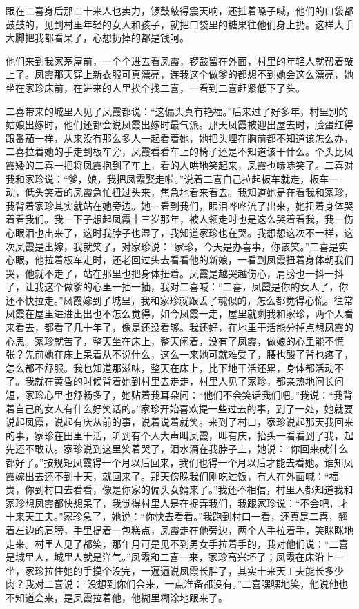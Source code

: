\documentclass[12pt,UTF8]{ctexbook}
\begin{document}
跟在二喜身后那二十来人也卖力，锣鼓敲得震天响，还扯着嗓子喊，他们的口袋都鼓鼓的，见到村里年轻的女人和孩子，就把口袋里的糖果往他们身上扔。这样大手大脚把我都看呆了，心想扔掉的都是钱呵。

他们来到我家茅屋前，一个个进去看凤霞，锣鼓留在外面，村里的年轻人就帮着敲上了。凤霞那天穿上新衣服可真漂亮，连我这个做爹的都想不到她会这么漂亮，她坐在家珍床前，在进来的人里挨个找二喜，一看到二喜赶紧低下了头。

二喜带来的城里人见了凤霞都说：“这偏头真有艳福。”后来过了好多年，村里别的姑娘出嫁时，他们还都会说凤霞出嫁时最气派。那天凤霞被迎出屋去时，脸蛋红得跟番茄一样，从来没有那么多人一起看着她，她把头埋在胸前都不知道该怎么办，二喜拉着她的手走到板车旁，凤霞看看车上的椅子还是不知道该干什么。个头比凤霞矮的二喜一把将凤霞抱到了车上，看的人哄地笑起来，凤霞也哧哧笑了。二喜对我和家珍说：“爹，娘，我把凤霞娶走啦。”说着二喜自己拉起板车就走，板车一动，低头笑着的凤霞急忙扭过头来，焦急地看来看去。我知道她是在看我和家珍，我背着家珍其实就站在她旁边。她一看到我们，眼泪哗哗流了出来，她扭着身体哭着看我们。我一下子想起凤霞十三岁那年，被人领走时也是这么哭着看我，我一伤心眼泪也出来了，这时我脖子也湿了，我知道家珍也在哭。我想想这次不一样，这次凤霞是出嫁，我就笑了，对家珍说：“家珍，今天是办喜事，你该笑。”二喜是实心眼，他拉着板车走时，还老回过头去看看他的新娘，一看到凤霞扭着身体朝我们哭，他就不走了，站在那里也把身体扭着。凤霞是越哭越伤心，肩膀也一抖一抖了，让我这个做爹的心里一抽一抽，我对二喜喊：“二喜，凤霞是你的女人了，你还不快拉走。”凤霞嫁到了城里，我和家珍就跟丢了魂似的，怎么都觉得心慌。往常凤霞在屋里进进出出也不怎么觉得，如今凤霞一走，屋里就剩我和家珍，两个人看来看去，都看了几十年了，像是还没看够。我还好，在地里干活能分掉点想凤霞的心思。家珍就苦了，整天坐在床上，整天闲着，没有了凤霞，做娘的心里能不慌张？先前她在床上呆着从不说什么，这么一来她可就难受了，腰也酸了背也疼了，怎么都不舒服。我也知道那滋味，整天在床上，比下地干活还累，身体都活动不了。我就在黄昏的时候背着她到村里去走走，村里人见了家珍，都亲热地问长问短，家珍心里也舒畅多了，她贴着我耳朵问：“他们不会笑话我们吧。”我说：“我背着自己的女人有什么好笑话的。”家珍开始喜欢提一些过去的事，到了一处，她就要说起凤霞，说起有庆从前的事，说着说着就笑。来到了村口，家珍说起那天我回来的事，家珍在田里干活，听到有个人大声叫凤霞，叫有庆，抬头一看看到了我，起先还不敢认。家珍说到这里笑着哭了，泪水滴在我脖子上，她说：“你回来就什么都好了。”按规矩凤霞得一个月以后回来，我们也得一个月以后才能去看她。谁知凤霞嫁出去还不到十天，就回来了。那天傍晚我们刚吃过饭，有人在外面喊：“福贵，你到村口去看看，像是你家的偏头女婿来了。”我还不相信，村里人都知道我和家珍想凤霞都快想呆了，我觉得村里人是在捉弄我们，我跟家珍说：“不会吧，才十来天工夫。”家珍急了，她说：“你快去看看。”我跑到村口一看，还真是二喜，翘着左边的肩膀，手里提着一包糕点，凤霞走在他旁边，两个人手拉着手，笑眯眯地走来。村里人见了都笑，那年月可是见不到男女手拉着手的，我对他们说：“二喜是城里人，城里人就是洋气。”凤霞和二喜一来，家珍高兴坏了；凤霞在床沿上一坐，家珍拉住她的手摸个没完，一遍遍说凤霞长胖了，其实十来天工夫能长多少肉？我对二喜说：“没想到你们会来，一点准备都没有。”二喜嘿嘿地笑，他说他也不知道会来，是凤霞拉着他，他糊里糊涂地跟来了。
\end{document}
